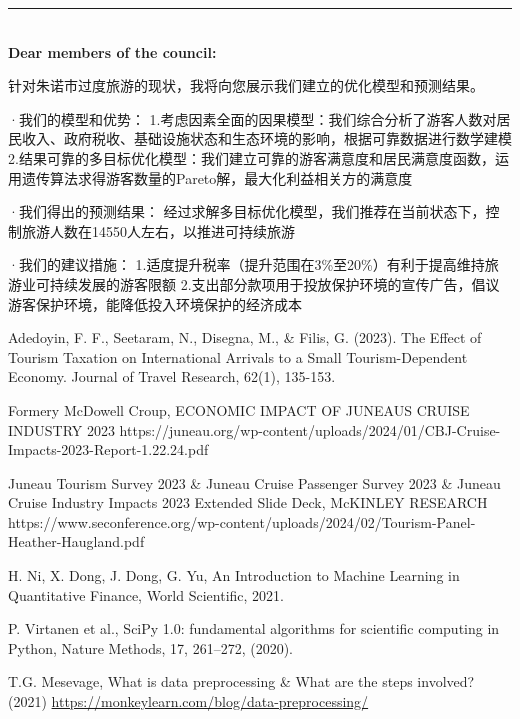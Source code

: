 \documentclass[12pt]{article}  %
\begin{document}
 {\noindent}	 \rule[-0pt]{16.5cm}{0.15em}\\
\noindent
\textbf{Dear members of the council:}

针对朱诺市过度旅游的现状，我将向您展示我们建立的优化模型和预测结果。

·我们的模型和优势：
1.考虑因素全面的因果模型：我们综合分析了游客人数对居民收入、政府税收、基础设施状态和生态环境的影响，根据可靠数据进行数学建模
2.结果可靠的多目标优化模型：我们建立可靠的游客满意度和居民满意度函数，运用遗传算法求得游客数量的Pareto解，最大化利益相关方的满意度

·我们得出的预测结果：
经过求解多目标优化模型，我们推荐在当前状态下，控制旅游人数在14550人左右，以推进可持续旅游

·我们的建议措施：
1.适度提升税率（提升范围在3\%至20\%）有利于提高维持旅游业可持续发展的游客限额
2.支出部分款项用于投放保护环境的宣传广告，倡议游客保护环境，能降低投入环境保护的经济成本
 \clearpage   %
 
 \begin{thebibliography}{99}
    Adedoyin, F. F., Seetaram, N., Disegna, M., \& Filis, G. (2023). The Effect of Tourism Taxation on International Arrivals to a Small Tourism-Dependent Economy. Journal of Travel Research, 62(1), 135-153. 
     
    Formery McDowell Croup, ECONOMIC IMPACT OF JUNEAU\textquotesingle S CRUISE INDUSTRY 2023
    {https://juneau.org/wp-content/uploads/2024/01/CBJ-Cruise-Impacts-2023-Report-1.22.24.pdf}

    Juneau Tourism Survey 2023 \& Juneau Cruise Passenger Survey 2023 \& Juneau Cruise Industry Impacts 2023 Extended Slide Deck, McKINLEY RESEARCH
    {https://www.seconference.org/wp-content/uploads/2024/02/Tourism-Panel-Heather-Haugland.pdf}

   H. Ni, X. Dong, J. Dong, G. Yu, An Introduction to Machine Learning in Quantitative Finance, World Scientific, 2021.
   
   P. Virtanen et al., SciPy 1.0: fundamental algorithms for scientific computing in
   Python, Nature Methods, 17, 261--272, (2020).
   
   T.G. Mesevage, What is data preprocessing \& What are the steps involved? (2021) \href{https://monkeylearn.com/blog/data-preprocessing/}{https://monkeylearn.com/blog/data-preprocessing/}
 \end{thebibliography}
 
 
 
\end{document}
